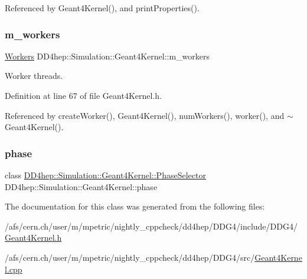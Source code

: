 Referenced by Geant4\+Kernel(), and print\+Properties().

\hypertarget{class_d_d4hep_1_1_simulation_1_1_geant4_kernel_a8957db5b08d92dcd7b7c4ef63ea743b6}{}\label{class_d_d4hep_1_1_simulation_1_1_geant4_kernel_a8957db5b08d92dcd7b7c4ef63ea743b6} 
\subsubsection{\texorpdfstring{m\+\_\+workers}{m\_workers}}
{\footnotesize\ttfamily \hyperlink{class_d_d4hep_1_1_simulation_1_1_geant4_kernel_ae9fdf26cda88a6f822f060558e85d797}{Workers} D\+D4hep\+::\+Simulation\+::\+Geant4\+Kernel\+::m\+\_\+workers\hspace{0.3cm}{\ttfamily [protected]}}



Worker threads. 



Definition at line 67 of file Geant4\+Kernel.\+h.



Referenced by create\+Worker(), Geant4\+Kernel(), num\+Workers(), worker(), and $\sim$\+Geant4\+Kernel().

\hypertarget{class_d_d4hep_1_1_simulation_1_1_geant4_kernel_ae7d402daf48f3cd062f1617c5a7ee429}{}\label{class_d_d4hep_1_1_simulation_1_1_geant4_kernel_ae7d402daf48f3cd062f1617c5a7ee429} 
\subsubsection{\texorpdfstring{phase}{phase}}
{\footnotesize\ttfamily class \hyperlink{class_d_d4hep_1_1_simulation_1_1_geant4_kernel_1_1_phase_selector}{D\+D4hep\+::\+Simulation\+::\+Geant4\+Kernel\+::\+Phase\+Selector}  D\+D4hep\+::\+Simulation\+::\+Geant4\+Kernel\+::phase}



The documentation for this class was generated from the following files\+:\begin{DoxyCompactItemize}
\item 
/afs/cern.\+ch/user/m/mpetric/nightly\+\_\+cppcheck/dd4hep/\+D\+D\+G4/include/\+D\+D\+G4/\hyperlink{_geant4_kernel_8h}{Geant4\+Kernel.\+h}\item 
/afs/cern.\+ch/user/m/mpetric/nightly\+\_\+cppcheck/dd4hep/\+D\+D\+G4/src/\hyperlink{_geant4_kernel_8cpp}{Geant4\+Kernel.\+cpp}\end{DoxyCompactItemize}
